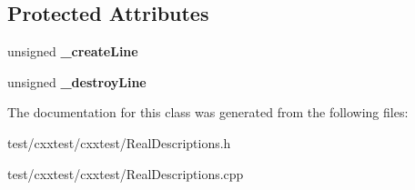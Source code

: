 \subsection*{Protected Attributes}
\begin{DoxyCompactItemize}
\item 
\hypertarget{classCxxTest_1_1CommonDynamicSuiteDescription_a45066a52ecfbeb67b1147320a787a658}{unsigned {\bfseries \-\_\-create\-Line}}\label{classCxxTest_1_1CommonDynamicSuiteDescription_a45066a52ecfbeb67b1147320a787a658}

\item 
\hypertarget{classCxxTest_1_1CommonDynamicSuiteDescription_aec97970462595159ebe593628a3bef5a}{unsigned {\bfseries \-\_\-destroy\-Line}}\label{classCxxTest_1_1CommonDynamicSuiteDescription_aec97970462595159ebe593628a3bef5a}

\end{DoxyCompactItemize}


The documentation for this class was generated from the following files\-:\begin{DoxyCompactItemize}
\item 
test/cxxtest/cxxtest/Real\-Descriptions.\-h\item 
test/cxxtest/cxxtest/Real\-Descriptions.\-cpp\end{DoxyCompactItemize}
